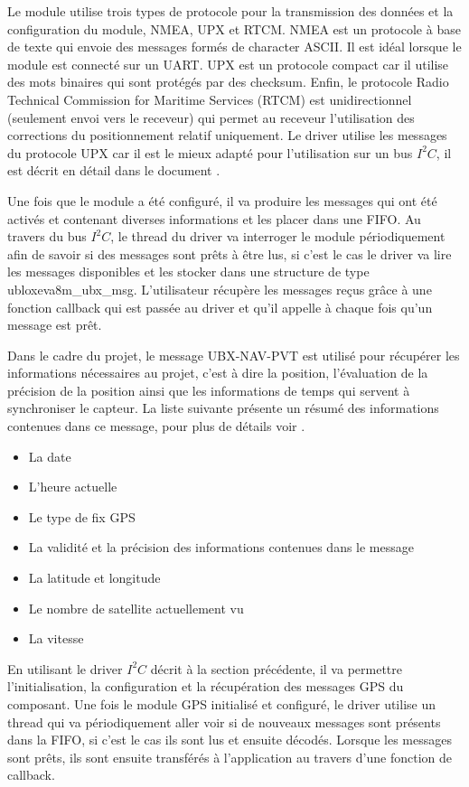 Le module utilise trois types de protocole pour la transmission des données et la configuration du module, NMEA, UPX et RTCM. NMEA est un protocole à base de texte qui envoie des messages formés de character ASCII. Il est idéal lorsque le module est connecté sur un UART. UPX est un protocole compact car il utilise des mots binaires qui sont protégés par des checksum. Enfin, le protocole Radio Technical Commission for Maritime Services (RTCM) est unidirectionnel (seulement envoi vers le receveur) qui permet au receveur l'utilisation des corrections du positionnement relatif uniquement.
Le driver utilise les messages du protocole UPX car il est le mieux adapté pour l'utilisation sur un bus $I^{2}C$, il est décrit en détail dans le document \cite{ublox-protocol}.

Une fois que le module a été configuré, il va produire les messages qui ont été activés et contenant diverses informations et les placer dans une FIFO. Au travers du bus $I^{2}C$, le thread du driver va interroger le module périodiquement afin de savoir si des messages sont prêts à être lus, si c'est le cas le driver va lire les messages disponibles et les stocker dans une structure de type ubloxeva8m\_ubx\_msg. L'utilisateur récupère les messages reçus grâce à une fonction callback qui est passée au driver et qu'il appelle à chaque fois qu'un message est prêt.

Dans le cadre du projet, le message UBX-NAV-PVT est utilisé pour récupérer les informations nécessaires au projet, c'est à dire la position, l'évaluation de la précision de la position ainsi que les informations de temps qui servent à synchroniser le capteur. La liste suivante présente un résumé des informations contenues dans ce message, pour plus de détails voir \cite[p.~307]{ublox-protocol}.

\begin{itemize}
 \item La date
 \item L'heure actuelle 
 \item Le type de fix GPS
 \item La validité et la précision des informations contenues dans le message
 \item La latitude et longitude
 \item Le nombre de satellite actuellement vu
 \item La vitesse
 \end{itemize} 

En utilisant le driver $I^{2}C$ décrit à la section précédente, il va permettre l'initialisation, la configuration et la récupération des messages GPS du composant. Une fois le module GPS initialisé et configuré, le driver utilise un thread qui va périodiquement aller voir si de nouveaux messages sont présents dans la FIFO, si c'est le cas ils sont lus et ensuite décodés. Lorsque les messages sont prêts, ils sont ensuite transférés à l'application au travers d'une fonction de callback.

